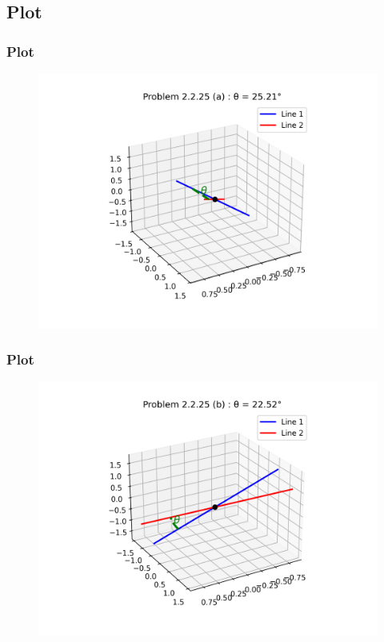 \documentclass{beamer}
\theoremstyle{remark}
\numberwithin{equation}{section}
\begin{document}
\subsection{Plot}
\begin{frame}
    \frametitle{Plot}
\begin{figure}[H]
    \centering
    \includegraphics[width=0.9\columnwidth]{figs/figure_a.png}
    \caption{}
    \label{fig:placeholder}
\end{figure}
\end{frame}

\begin{frame}
    \frametitle{Plot}
\begin{figure}[H]
    \centering
    \includegraphics[width=0.9\columnwidth]{figs/figure_b.png}
    \caption{}
    \label{fig:placeholder}
\end{figure}
\end{frame}
\end{document}
